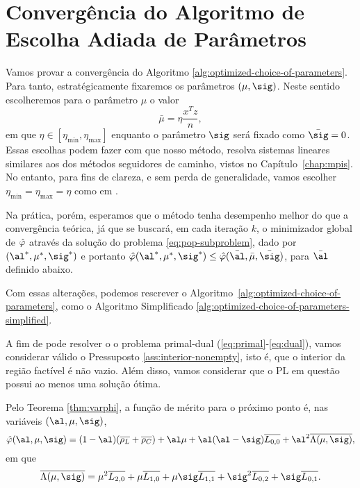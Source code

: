 \section{Convergência do Algoritmo de Escolha Adiada de Parâmetros}



Vamos provar  a convergência do Algoritmo \ref{alg:optimized-choice-of-parameters}. Para tanto, estratégicamente fixaremos os parâmetros $(\mu,\sig)$. Neste sentido escolheremos para o parâmetro  $\mu$ o valor \[\bar{\mu}=\eta\dfrac{x^Tz}{n},
\] 
em que $\eta\in [\eta_{\min},\eta_{\max} ]$ enquanto o parâmetro $\sig$ será fixado como $\bar{\sig} = 0$. Essas escolhas  podem fazer com que nosso método, resolva  sistemas lineares similares aos dos métodos seguidores de caminho, vistos no Capítulo~\ref{chap:mpis}.  No entanto, para fins de clareza, e sem perda de generalidade, vamos escolher $\eta_{\min}=\eta_{\max}=\eta $ como em  
\cite{Zhang:1995fu}.


 Na prática, porém, esperamos que  o método  tenha desempenho melhor do que a convergência teórica, já que se buscará, em cada iteração $k$,
o minimizador global de $\hat{\varphi}$ através da solução do problema \eqref{eq:pop-subproblem}, dado por $(\al^*,\mu^*,\sig^*)$ e portanto	$\nextphi(\al^*,\mu^*,\sig^*)\leq \nextphi(\bar{\al},\bar{\mu},\bar{\sig})$, para  $\bar{\al}$ definido abaixo.


Com essas alterações, podemos rescrever o Algoritmo~\ref{alg:optimized-choice-of-parameters}, como o  Algoritmo Simplificado \ref{alg:optimized-choice-of-parameters-simplified}.


A fim de pode  resolver o o problema primal-dual (\ref{eq:primal}-\ref{eq:dual}), vamos considerar válido o Pressuposto \ref{ass:interior-nonempty}, isto é, que o interior da região factível é não vazio. Além disso, vamos considerar que o \ac{PL} em questão possui ao menos uma solução ótima. 





Pelo Teorema \ref{thm:varphi}, a função de mérito para o próximo ponto   é, nas variáveis  $(\al,\mu,\sig)$,
\begin{equation*}
{\nextphi}(\al,\mu,\sig) =  (1-\al)(\dbvec{\rho_L} +
\dbvec{\rho_C}) + \al\mu + \al(\al-\sig)\dbvec{L_{0,0}} +
\al^2\dbvec{\Lambda(\mu,\sig)} ,
\end{equation*}
em que 
\[
\dbvec{\Lambda(\mu,\sig)} = \mu^2
 \dbvec{L_{2,0}} + \mu \dbvec{L_{1,0}} + 	\mu \sig \dbvec{L_{1,1}} +
 \sig^2 \dbvec{L_{0,2}} + \sig \dbvec{L_{0,1}}.
 \]


